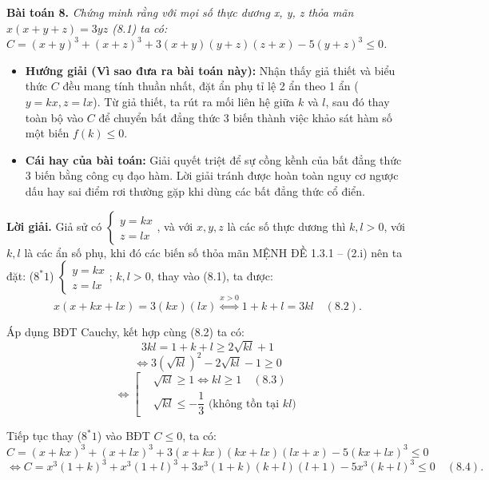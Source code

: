 \documentclass[12pt]{report}
\begin{document}
\vspace{0.4cm}
\noindent \textbf{Bài toán 8.} \textit{Chứng minh rằng với mọi số thực dương x, y, z thỏa mãn $x(x + y + z) = 3yz$ (8.1) ta có: $C = (x + y)^3 + (x + z)^3 + 3(x + y)(y + z)(z + x) - 5(y + z)^3 \leq 0$.}

\begin{itemize}
    \item[\textbf{1.}] \textbf{Hướng giải (Vì sao đưa ra bài toán này):} 
    Nhận thấy giả thiết và biểu thức $C$ đều mang tính thuần nhất, đặt ẩn phụ tỉ lệ 2 ẩn theo 1 ẩn ($y = kx, z = lx$). Từ giả thiết, ta rút ra mối liên hệ giữa $k$ và $l$, sau đó thay toàn bộ vào $C$ để chuyển bất đẳng thức 3 biến thành việc khảo sát hàm số một biến $f(k) \le 0$.

    \item[\textbf{2.}] \textbf{Cái hay của bài toán:} 
    Giải quyết triệt để sự cồng kềnh của bất đẳng thức 3 biến bằng công cụ đạo hàm. Lời giải tránh được hoàn toàn nguy cơ ngược dấu hay sai điểm rơi thường gặp khi dùng các bất đẳng thức cổ điển.
\end{itemize}
\vspace{0.3cm}
\noindent \textbf{Lời giải.} Giả sử có $\begin{cases} y = kx \\ z = lx \end{cases}$, và với $x, y, z$ là các số thực dương thì $k, l > 0$, với $k, l$ là các ẩn số phụ, khi đó các biến số thỏa mãn MỆNH ĐỀ 1.3.1 -- (2.i) nên ta đặt: ($8^*1$) $\begin{cases} y = kx \\ z = lx \end{cases}$; $k, l > 0$, thay vào (8.1), ta được:
\[
x(x + kx + lx) = 3(kx)(lx) \overset{x > 0}{\Leftrightarrow} 1 + k + l = 3kl \quad (8.2).
\]

\noindent Áp dụng BĐT Cauchy, kết hợp cùng (8.2) ta có:
\[
3kl = 1 + k + l \geq 2\sqrt{kl} + 1
\]
\[
\Leftrightarrow 3(\sqrt{kl})^2 - 2\sqrt{kl} - 1 \geq 0
\]
\[
\Leftrightarrow \left[ 
\begin{aligned}
&\sqrt{kl} \geq 1 \Leftrightarrow kl \geq 1 \quad (8.3) \\
&\sqrt{kl} \leq -\dfrac{1}{3} \text{ (không tồn tại } kl)
\end{aligned} 
\right.
\]

\noindent Tiếp tục thay ($8^*1$) vào BĐT $C \leq 0$, ta có:
\[
C = (x + kx)^3 + (x + lx)^3 + 3(x + kx)(kx + lx)(lx + x) - 5(kx + lx)^3 \leq 0
\]
\[
\Leftrightarrow C = x^3(1 + k)^3 + x^3(1 + l)^3 + 3x^3(1 + k)(k + l)(l + 1) - 5x^3(k + l)^3 \leq 0 \quad (8.4).
\]
\end{document}
